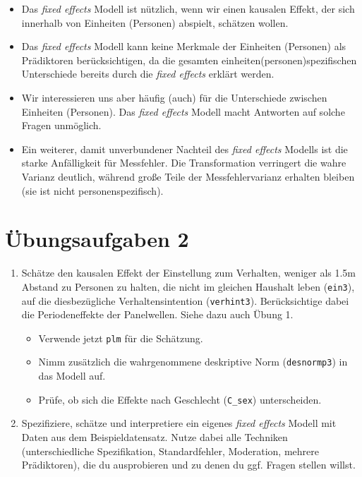 \documentclass[
]{book}
\providecommand{\tightlist}{%
  \setlength{\itemsep}{0pt}\setlength{\parskip}{0pt}}
\begin{document}
\begin{itemize}
\item
  Das \emph{fixed effects} Modell ist nützlich, wenn wir einen kausalen Effekt, der sich innerhalb von Einheiten (Personen) abspielt, schätzen wollen.
\item
  Das \emph{fixed effects} Modell kann keine Merkmale der Einheiten (Personen) als Prädiktoren berücksichtigen, da die gesamten einheiten(personen)spezifischen Unterschiede bereits durch die \emph{fixed effects} erklärt werden.
\item
  Wir interessieren uns aber häufig (auch) für die Unterschiede zwischen Einheiten (Personen). Das \emph{fixed effects} Modell macht Antworten auf solche Fragen unmöglich.
\item
  Ein weiterer, damit unverbundener Nachteil des \emph{fixed effects} Modells ist die starke Anfälligkeit für Messfehler. Die Transformation verringert die wahre Varianz deutlich, während große Teile der Messfehlervarianz erhalten bleiben (sie ist nicht personenspezifisch).
\end{itemize}

\hypertarget{uxfcbungsaufgaben-2}{%
\section{Übungsaufgaben 2}\label{uxfcbungsaufgaben-2}}

\begin{enumerate}
\def\labelenumi{\arabic{enumi})}
\tightlist
\item
  Schätze den kausalen Effekt der Einstellung zum Verhalten, weniger als 1.5m Abstand zu Personen zu halten, die nicht im gleichen Haushalt leben (\texttt{ein3}), auf die diesbezügliche Verhaltensintention (\texttt{verhint3}). Berücksichtige dabei die Periodeneffekte der Panelwellen. Siehe dazu auch Übung 1.

  \begin{itemize}
  \tightlist
  \item
    Verwende jetzt \texttt{plm} für die Schätzung.
  \item
    Nimm zusätzlich die wahrgenommene deskriptive Norm (\texttt{desnormp3}) in das Modell auf.
  \item
    Prüfe, ob sich die Effekte nach Geschlecht (\texttt{C\_sex}) unterscheiden.
  \end{itemize}
\item
  Spezifiziere, schätze und interpretiere ein eigenes \emph{fixed effects} Modell mit Daten aus dem Beispieldatensatz. Nutze dabei alle Techniken (unterschiedliche Spezifikation, Standardfehler, Moderation, mehrere Prädiktoren), die du ausprobieren und zu denen du ggf. Fragen stellen willst.
\end{enumerate}
\end{document}
